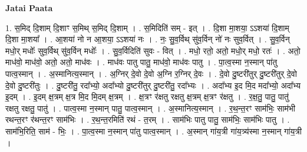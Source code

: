 \documentclass[17pt]{extarticle}
\begin{document}
\textbf{Jatai Paata} \newline

1. स॒मिद् दि॒शाम् दि॒शाꣳ स॒मिथ् स॒मिद् दि॒शाम् । . स॒मिदिति॑ सम् - इत् । . दि॒शा मा॒शया॒ ऽऽशया॑ दि॒शाम् दि॒शा मा॒शया᳚ । . आ॒शया॑ नो न आ॒शया॒ ऽऽशया॑ नः । . नः॒ सु॒व॒र्विथ् सु॑व॒र्विन् नो॑ नः सुव॒र्वित् । . सु॒व॒र्विन् मधो॒र् मधोः᳚ सुव॒र्विथ् सु॑व॒र्विन् मधोः᳚ । . सु॒व॒र्विदिति॑ सुवः - वित् । . मधो॒ रतो॒ अतो॒ मधो॒र् मधो॒ रतः॑ । . अतो॒ माध॑वो॒ माध॑वो॒ अतो॒ अतो॒ माध॑वः । . माध॑वः पातु पातु॒ माध॑वो॒ माध॑वः पातु । . पा॒त्व॒स्मा न॒स्मान् पा॑तु पात्व॒स्मान् । . अ॒स्मानित्य॒स्मान् । . अ॒ग्निर् दे॒वो दे॒वो अ॒ग्नि र॒ग्निर् दे॒वः । . दे॒वो दु॒ष्टरी॑तुर् दु॒ष्टरी॑तुर् दे॒वो दे॒वो दु॒ष्टरी॑तुः । . दु॒ष्टरी॑तु॒ रदा᳚भ्यो॒ अदा᳚भ्यो दु॒ष्टरी॑तुर् दु॒ष्टरी॑तु॒ रदा᳚भ्यः । . अदा᳚भ्य इ॒द मि॒द मदा᳚भ्यो॒ अदा᳚भ्य इ॒दम् । . इ॒दम् क्ष॒त्रम् क्ष॒त्र मि॒द मि॒दम् क्ष॒त्रम् । . क्ष॒त्रꣳ र॑क्षतु रक्षतु क्ष॒त्रम् क्ष॒त्रꣳ र॑क्षतु । . र॒क्ष॒तु॒ पातु॒ पातु॑ रक्षतु रक्षतु॒ पातु॑ । . पात्व॒स्मा न॒स्मान् पातु॒ पात्व॒स्मान् । . अ॒स्मानित्य॒स्मान् । . र॒थ॒न्त॒रꣳ साम॑भिः॒ साम॑भी रथन्त॒रꣳ र॑थन्त॒रꣳ साम॑भिः । . र॒थ॒न्त॒रमिति॑ रथं - त॒रम् । . साम॑भिः पातु पातु॒ साम॑भिः॒ साम॑भिः पातु । . साम॑भि॒रिति॒ साम॑ - भिः॒ । . पा॒त्व॒स्मा न॒स्मान् पा॑तु पात्व॒स्मान् । . अ॒स्मान् गा॑य॒त्री गा॑य॒त्र्य॑स्मा न॒स्मान् गा॑य॒त्री । \newline
\end{document}
